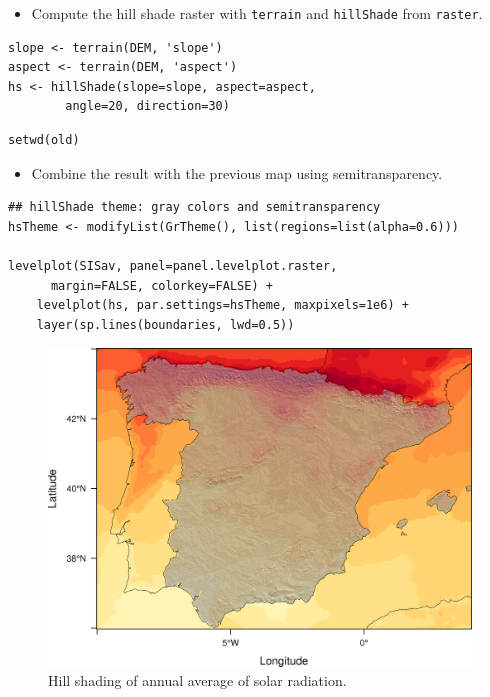 \begin{itemize}
\item Compute the hill shade raster with \texttt{terrain} and \texttt{hillShade} from \texttt{raster}.
\end{itemize}

\lstset{language=R,numbers=none}
\begin{lstlisting}
slope <- terrain(DEM, 'slope')
aspect <- terrain(DEM, 'aspect')
hs <- hillShade(slope=slope, aspect=aspect,
		angle=20, direction=30)
\end{lstlisting}
\lstset{language=R,numbers=none}
\begin{lstlisting}
setwd(old)
\end{lstlisting}

\begin{itemize}
\item Combine the result with the previous map using semitransparency.
\end{itemize}

\lstset{language=R,numbers=none}
\begin{lstlisting}
## hillShade theme: gray colors and semitransparency
hsTheme <- modifyList(GrTheme(), list(regions=list(alpha=0.6)))

levelplot(SISav, panel=panel.levelplot.raster,
	  margin=FALSE, colorkey=FALSE) +
    levelplot(hs, par.settings=hsTheme, maxpixels=1e6) +
    layer(sp.lines(boundaries, lwd=0.5))
\end{lstlisting}

\begin{figure}[htb]
\centering
\includegraphics[width=.9\linewidth]{figs/hillShading.png}
\caption{\label{fig:hillShading}Hill shading of annual average of solar radiation.}
\end{figure}
